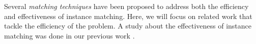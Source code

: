 

Several \emph{matching techniques} have been proposed to address both the efficiency and effectiveness of instance matching. Here, we will focus on related work that tackle the efficiency of the problem. A study about the effectiveness of instance matching was done in our previous work \cite{serimi}. 

